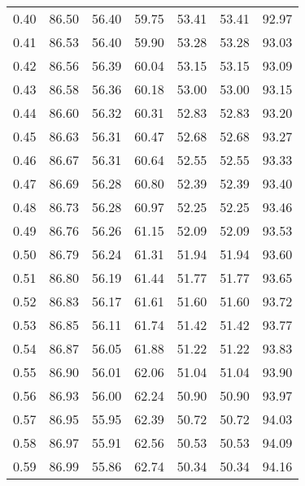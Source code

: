 \begin{tabular}{|c|c|c|c|c|c|c|}
      0.40 &     86.50 &     56.40 &      59.75 &   53.41 &      53.41 &         92.97 \\
      0.41 &     86.53 &     56.40 &      59.90 &   53.28 &      53.28 &         93.03 \\
      0.42 &     86.56 &     56.39 &      60.04 &   53.15 &      53.15 &         93.09 \\
      0.43 &     86.58 &     56.36 &      60.18 &   53.00 &      53.00 &         93.15 \\
      0.44 &     86.60 &     56.32 &      60.31 &   52.83 &      52.83 &         93.20 \\
      0.45 &     86.63 &     56.31 &      60.47 &   52.68 &      52.68 &         93.27 \\
      0.46 &     86.67 &     56.31 &      60.64 &   52.55 &      52.55 &         93.33 \\
      0.47 &     86.69 &     56.28 &      60.80 &   52.39 &      52.39 &         93.40 \\
      0.48 &     86.73 &     56.28 &      60.97 &   52.25 &      52.25 &         93.46 \\
      0.49 &     86.76 &     56.26 &      61.15 &   52.09 &      52.09 &         93.53 \\
      0.50 &     86.79 &     56.24 &      61.31 &   51.94 &      51.94 &         93.60 \\
      0.51 &     86.80 &     56.19 &      61.44 &   51.77 &      51.77 &         93.65 \\
      0.52 &     86.83 &     56.17 &      61.61 &   51.60 &      51.60 &         93.72 \\
      0.53 &     86.85 &     56.11 &      61.74 &   51.42 &      51.42 &         93.77 \\
      0.54 &     86.87 &     56.05 &      61.88 &   51.22 &      51.22 &         93.83 \\
      0.55 &     86.90 &     56.01 &      62.06 &   51.04 &      51.04 &         93.90 \\
      0.56 &     86.93 &     56.00 &      62.24 &   50.90 &      50.90 &         93.97 \\
      0.57 &     86.95 &     55.95 &      62.39 &   50.72 &      50.72 &         94.03 \\
      0.58 &     86.97 &     55.91 &      62.56 &   50.53 &      50.53 &         94.09 \\
      0.59 &     86.99 &     55.86 &      62.74 &   50.34 &      50.34 &         94.16 \\

\end{tabular}
